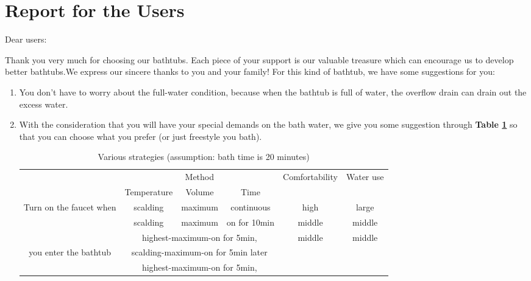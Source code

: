 \documentclass[12pt]{article}
\begin{document}
\clearpage
{\renewcommand{\baselinestretch}{1.3}\normalsize
\section*{Report for the Users}
\begin{flushleft}
Dear users:
\end{flushleft}

Thank you very much for choosing our bathtubs. Each piece of your support is our valuable treasure
which can encourage us to develop better bathtubs.We express our sincere thanks to you and your
family!
For this kind of bathtub, we have some suggestions for you:
\begin{enumerate}[\bf 1.]
    \item You don't have to worry about the full-water condition, because when the bathtub is full
    of water, the overflow drain can drain out the excess water.
    \item With the consideration that you will have your special demands on the bath water, we give
    you some suggestion through \textbf{Table \ref{advices}} so that you can choose what you prefer
    (or just freestyle you bath).
    \begin{table}[!htbp]
    \centering
    \footnotesize
    \caption{Various strategies (assumption: bath time is 20 minutes)}
    \label{advices}
        \begin{tabular}{c|ccc|c|c}
        \toprule
        \multirow{2}{*}{} & \multicolumn{3}{c|}{Method}
         & \multirow{2}{*}{Comfortability} & \multirow{2}{*}{Water use}\\
        \cline{2-4} & \multicolumn{1}{c|}{Temperature} & \multicolumn{1}{c|}{Volume}
        & Time & {} & {}\\
        \midrule
        \multirow{3}{*}{Turn on the faucet when} & \multicolumn{1}{c|}{scalding}
         & \multicolumn{1}{c|}{maximum} & continuous & high & large\\
        \cline{2-6} & \multicolumn{1}{c|}{scalding} & \multicolumn{1}{c|}{maximum}
         & on for 10min & middle & middle\\
        \cline{2-6} & \multicolumn{3}{c|}{highest-maximum-on for 5min,}
         & \multirow{2}{*}{middle} & \multirow{2}{*}{middle}\\
        \multirow{3}{*}{you enter the bathtub}
         & \multicolumn{3}{c|}{scalding-maximum-on for 5min later}{} & {} & \\
        \cline{2-6} & \multicolumn{3}{c|}{highest-maximum-on for 5min,}

\end{tabular}
\end{table}
\end{enumerate}}
\end{document}
